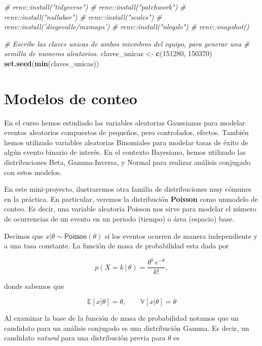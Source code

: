 \documentclass[
]{article}
\newenvironment{Shaded}{\begin{snugshade}}{\end{snugshade}}
\newcommand{\CommentTok}[1]{\textcolor[rgb]{0.56,0.35,0.01}{\textit{#1}}}
\newcommand{\DecValTok}[1]{\textcolor[rgb]{0.00,0.00,0.81}{#1}}
\newcommand{\KeywordTok}[1]{\textcolor[rgb]{0.13,0.29,0.53}{\textbf{#1}}}
\newcommand{\NormalTok}[1]{#1}
\newcommand{\StringTok}[1]{\textcolor[rgb]{0.31,0.60,0.02}{#1}}
\begin{document}
\begin{Shaded}
\begin{Highlighting}[]
\CommentTok{# renv::install("tidyverse")}
\CommentTok{# renv::install("patchwork")}
\CommentTok{# renv::install("nullabor")}
\CommentTok{# renv::install("scales")}
\CommentTok{# renv::install('diegovalle/mxmaps')}
\CommentTok{# renv::install("nleqslv")}
\CommentTok{# renv::snapshot()}

\CommentTok{# Escribe las claves unicas de ambos miembros del equipo, para generar una}
\CommentTok{# semilla de numeros aleatorios.}
\NormalTok{claves_unicas <-}\StringTok{ }\KeywordTok{c}\NormalTok{(}\DecValTok{151280}\NormalTok{, }\DecValTok{150370}\NormalTok{)}
\KeywordTok{set.seed}\NormalTok{(}\KeywordTok{min}\NormalTok{(claves_unicas))}
\end{Highlighting}
\end{Shaded}

\hypertarget{modelos-de-conteo}{%
\section{Modelos de conteo}\label{modelos-de-conteo}}

En el curso hemos estudiado las variables aleatorias Gaussianas para
modelar eventos aleatorios compuestos de pequeños, pero controlados,
efectos. También hemos utilizado variables aleatorias Binomiales para
modelar tasas de éxito de algún evento binario de interés. En el
contexto Bayesiano, hemos utilizado las distribuciones Beta,
Gamma-Inversa, y Normal para realizar análisis conjugado con estos
modelos.

En este mini-proyecto, ilustraremos otra familia de distribuciones muy
cómunes en la práctica. En particular, veremos la distribución
\textbf{Poisson} como unmodelo de conteo. Es decir, una variable
aleatoria Poisson nos sirve para modelar el número de ocurrencias de un
evento en un periodo (tiempo) o área (espacio) base.

Decimos que \(x|\theta \sim \textsf{Poisson}(\theta)\) si los eventos
ocurren de manera independiente y a una tasa constante. La función de
masa de probabilidad esta dada por

\[ p(X = k \, | \, \theta) = \frac{\theta^k \, e^{-\theta}}{k!},\]

donde sabemos que

\[ \mathbb{E}[x|\theta] = \theta, \qquad  \mathbb{V}[x|\theta] = \theta \]

Al examinar la base de la función de masa de probabilidad notamos que un
candidato para un anålisis conjugado es una distribución Gamma. Es
decir, un candidato \emph{natural} para una distribución previa para
\(\theta\) es
\end{document}
